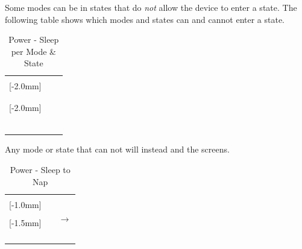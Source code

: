 \par\medskip


\par\medskip

Some modes can be in states that do \textit{not} allow the device to enter a
 state.  The following table shows which modes and states can and
cannot enter a  state.

\begin{table}[H]
  \begin{tabu} { X[1,c,m] | X[1,c,m] | X[1,c,m] }
  \thrule
   &  &  \\ \mrule

  [-2.0mm]{\hyperref[Timer]{}}
    &  &  \\
    &  & \\ 
    &  &  \\ \mrule

  [-2.0mm]{\hyperref[Touch Settings]{}}
    &  &  \\
    &  & \\
    &  & \\
    &  & \\ 
    &  &  \\ \mrule

   &  &  \\
  \bhrule
  \end{tabu}
\caption{Power - Sleep per Mode \& State}
\end{table}

\pagebreak

Any mode or state that can not  will instead  and 
the screens.

\begin{table}[H]
  \begin{tabu} { X[1,c,m] | X[1,c,m] | X[1,c,m] }
  \thrule
   &  &  \\ \mrule

  [-1.0mm]{\hyperref[Timer]{}}
    &  &  \\
    &  & \\ 

  [-1.5mm]{\hyperref[Touch Settings]{}}
    &  & \\
    &  & \\
    &  & \\
    &  & \\

  \bhrule
  \end{tabu}
\caption{Power - Sleep to Nap}
\end{table}

